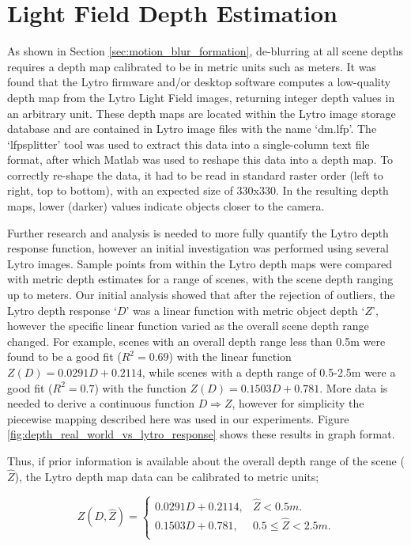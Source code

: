 \section{Light Field Depth Estimation}
\label{sec:light_field_depth_estimation}

As shown in Section \ref{sec:motion_blur_formation}, de-blurring at all scene depths requires a depth map calibrated to be in metric units such as meters.
It was found that the Lytro firmware and/or desktop software computes a low-quality depth map from the Lytro Light Field images, returning integer depth values in an arbitrary unit.
These depth maps are located within the Lytro image storage database and are contained in Lytro image files with the name \enquote*{dm.lfp}.
The \enquote*{lfpsplitter} tool \cite{patel2013lfptools} was used to extract this data into a single-column text file format, after which Matlab was used to reshape this data into a depth map.
To correctly re-shape the data, it had to be read in standard raster order (left to right, top to bottom), with an expected size of 330x330.
In the resulting depth maps, lower (darker) values indicate objects closer to the camera.

Further research and analysis is needed to more fully quantify the Lytro depth response function, however an initial investigation was performed using several Lytro images.
Sample points from within the Lytro depth maps were compared with metric depth estimates for a range of scenes, with the scene depth ranging up to  meters.
Our initial analysis showed that after the rejection of outliers, the Lytro depth response \enquote*{$D$} was a linear function with metric object depth \enquote*{$Z$}, however the specific linear function varied as the overall scene depth range changed.
For example, scenes with an overall depth range less than 0.5m were found to be a good fit ($R^2 = 0.69$) with the linear function $Z(D) = 0.0291 D + 0.2114$, while scenes with a depth range of 0.5-2.5m were a good fit ($R^2 = 0.7$) with the function $Z(D) = 0.1503 D + 0.781$.
More data is needed to derive a continuous function $D \Rightarrow Z$, however for simplicity the piecewise mapping described here was used in our experiments.
Figure \ref{fig:depth_real_world_vs_lytro_response} shows these results in graph format.

Thus, if prior information is available about the overall depth range of the scene ($\hat{Z}$), the Lytro depth map data can be calibrated to metric units;

\begin{equation}
\label{eq:lytro_dm_to_metric}
Z(D, \hat{Z}) = \begin{cases}
	0.0291 D + 0.2114, & \hat{Z} < 0.5m. \\
	0.1503 D + 0.781, & 0.5 \leq \hat{Z} < 2.5m. \\
\end{cases}
\end{equation}

